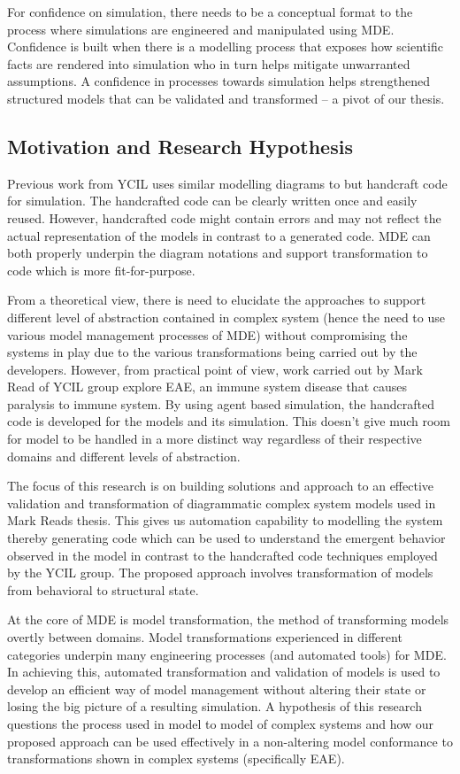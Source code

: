 \documentclass[10pt]{article}
\begin{document}
For confidence on simulation, there needs to be a conceptual format to the process where simulations are engineered and manipulated using MDE. Confidence is built when there is a modelling process that exposes how scientific facts are rendered into simulation who in turn helps mitigate unwarranted assumptions. A confidence in processes towards simulation helps strengthened structured models that can be validated and transformed – a pivot of our thesis.

\subsection{Motivation and Research Hypothesis}

Previous work from YCIL uses similar modelling diagrams to but handcraft code for simulation. The handcrafted code can be clearly written once and easily reused. However, handcrafted code might contain errors and may not reflect the actual representation of the models in contrast to a generated code. MDE can both properly underpin the diagram notations and support transformation to code which is more fit-for-purpose. 

From a theoretical view, there is need to elucidate the approaches to support different level of abstraction contained in complex system (hence the need to use various model management processes of MDE) without compromising the systems in play due to the various transformations being carried out by the developers. However, from practical point of view, work carried out by Mark Read of YCIL group explore EAE, an immune system disease that causes paralysis to immune system. By using agent based simulation, the handcrafted code is developed for the models and its simulation. This doesn't give much room for model to be handled in a more distinct way regardless of their respective domains and different levels of abstraction. 

The focus of this research is on building solutions and approach to an effective validation and transformation of diagrammatic complex system models used in Mark Reads thesis. This gives us automation capability to modelling the system thereby generating code which can be used to understand the emergent behavior observed in the model in contrast to the handcrafted code techniques employed by the YCIL group. The proposed approach involves transformation of models from behavioral to structural state. 

At the core of MDE is model transformation, the method of transforming models overtly between domains. Model transformations experienced in different categories underpin many engineering processes (and automated tools) for MDE. In achieving this, automated transformation and validation of models is used to develop an efficient way of model management without altering their state or losing the big picture of a resulting simulation. A hypothesis of this research questions the process used in model to model of complex systems and how our proposed approach can be used effectively in a non-altering model conformance to transformations shown in complex systems (specifically EAE).
\end{document}
